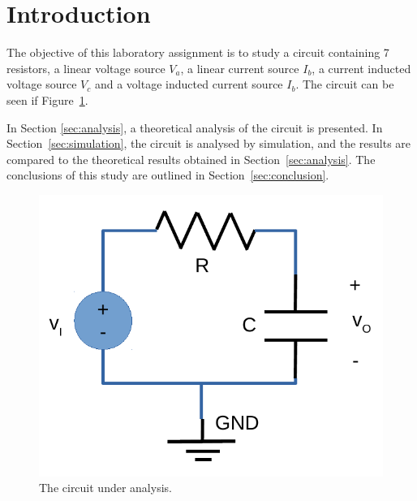 \section{Introduction}
\label{sec:introduction}

The objective of this laboratory assignment is to study a circuit containing 7 resistors, a linear voltage source $V_a$, a linear current source $I_b$, a current inducted voltage source $V_c$ and a voltage inducted current source $I_b$. The circuit can be seen if Figure~\ref{fig:rc}.


In Section \ref{sec:analysis}, a theoretical analysis of the circuit is
presented. In Section~\ref{sec:simulation}, the circuit is analysed by
simulation, and the results are compared to the theoretical results obtained in
Section~\ref{sec:analysis}. The conclusions of this study are outlined in
Section~\ref{sec:conclusion}.



\begin{figure}[h] \centering
\includegraphics[width=0.4\linewidth]{rc.pdf}
\caption{The circuit under analysis.}
\label{fig:rc}
\end{figure}

